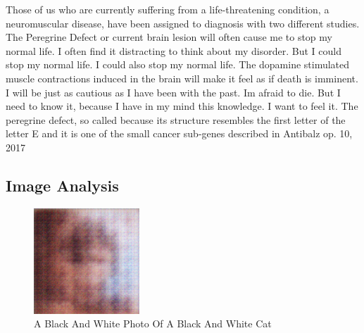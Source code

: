 \documentclass{article}%
\begin{document}
Those of us who are currently suffering from a life{-}threatening condition, a neuromuscular disease, have been assigned to diagnosis with two different studies. The Peregrine Defect or current brain lesion will often cause me to stop my normal life. I often find it distracting to think about my disorder. But I could stop my normal life. I could also stop my normal life. The dopamine stimulated muscle contractions induced in the brain will make it feel as if death is imminent. I will be just as cautious as I have been with the past. Im afraid to die. But I need to know it, because I have in my mind this knowledge. I want to feel it.\newline%
The peregrine defect, so called because its structure resembles the first letter of the letter E and it is one of the small cancer sub{-}genes described in Antibalz op. 10, 2017

%
\subsection{Image Analysis}%
\label{subsec:ImageAnalysis}%


\begin{figure}[h!]%
\centering%
\includegraphics[width=150px]{500_fake_images/samples_5_332.png}%
\caption{A Black And White Photo Of A Black And White Cat}%
\end{figure}

%
\end{document}
